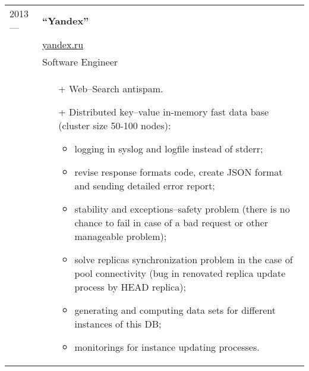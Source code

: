 \documentclass[a4paper, 10pt]{article}
\begin{document}
\begin{longtable}{p{20mm}|p{140mm}}
2013 ---
& \textbf{``Yandex''} \\
& \href{https://yandex.ru/}{yandex.ru} \\
& Software Engineer \\
& \begin{itemize}[topsep = 0pt, itemsep = 0pt]
    \item[+] Web--Search antispam.
    \item[+] Distributed key--value in-memory fast data base (cluster size 50-100 nodes):
        \begin{itemize}[topsep = 0pt, itemsep = 0pt]
            \item logging in syslog and logfile instead of stderr;
            \item revise response formats code, create JSON format and sending detailed error report;
            \item stability and exceptions--safety problem (there is no chance to fail in case of a bad request or other manageable problem);
            \item solve replicas synchronization problem in the case of pool connectivity (bug in renovated replica update process by HEAD replica);
            \item generating and computing data sets for different instances of this DB;
            \item monitorings for instance updating processes.
        \end{itemize}


\end{itemize}
\end{longtable}
\end{document}
